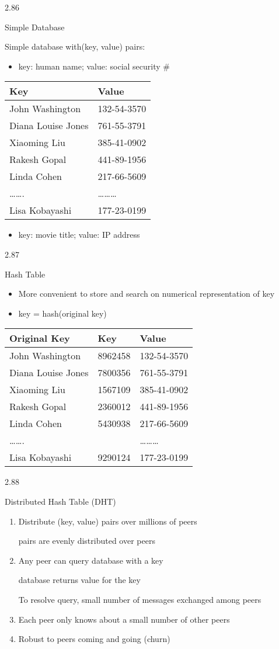 \documentclass[
]{article}
\begin{document}
2.86

Simple Database

Simple database with(key, value) pairs:

\begin{itemize}
\item
  key: human name; value: social security \#
\end{itemize}

\begin{longtable}[]{@{}ll@{}}
\toprule
\textbf{Key} & \textbf{Value}\tabularnewline
\midrule
\endhead
John Washington & 132-54-3570\tabularnewline
Diana Louise Jones & 761-55-3791\tabularnewline
Xiaoming Liu & 385-41-0902\tabularnewline
Rakesh Gopal & 441-89-1956\tabularnewline
Linda Cohen & 217-66-5609\tabularnewline
\ldots\ldots. & \ldots\ldots\ldots{}\tabularnewline
Lisa Kobayashi & 177-23-0199\tabularnewline
\bottomrule
\end{longtable}

\begin{itemize}
\item
  key: movie title; value: IP address
\end{itemize}

2.87

Hash Table

\begin{itemize}
\item
  More convenient to store and search on numerical representation of key
\item
  key = hash(original key)
\end{itemize}

\begin{longtable}[]{@{}lll@{}}
\toprule
\textbf{Original Key} & \textbf{Key} & \textbf{Value}\tabularnewline
\midrule
\endhead
John Washington & 8962458 & 132-54-3570\tabularnewline
Diana Louise Jones & 7800356 & 761-55-3791\tabularnewline
Xiaoming Liu & 1567109 & 385-41-0902\tabularnewline
Rakesh Gopal & 2360012 & 441-89-1956\tabularnewline
Linda Cohen & 5430938 & 217-66-5609\tabularnewline
\ldots\ldots. & & \ldots\ldots\ldots{}\tabularnewline
Lisa Kobayashi & 9290124 & 177-23-0199\tabularnewline
\bottomrule
\end{longtable}

2.88

Distributed Hash Table (DHT)

\begin{enumerate}
\def\labelenumi{\arabic{enumi}.}
\item
  Distribute (key, value) pairs over millions of peers

  pairs are evenly distributed over peers
\item
  Any peer can query database with a key

  database returns value for the key

  To resolve query, small number of messages exchanged among peers
\item
  Each peer only knows about a small number of other peers
\item
  Robust to peers coming and going (churn)
\end{enumerate}
\end{document}
